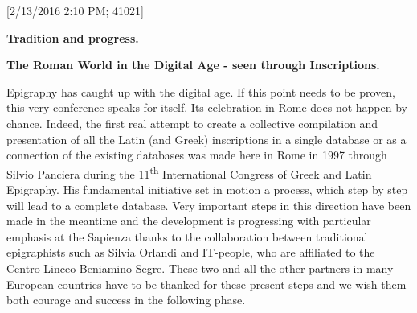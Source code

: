 \documentclass{article}
\begin{document}
[2/13/2016 2:10 PM; 41021]

\begin{center}
\textbf{Tradition and progress.}

\textbf{The Roman World in the Digital Age - seen through Inscriptions. }
\end{center}

Epigraphy has caught up with the digital age. If this point needs to be proven, 
this very conference speaks for itself.  Its celebration in Rome does not happen 
by chance. Indeed, the first real attempt to create a collective compilation and 
presentation of all the Latin (and Greek) inscriptions in a single database or 
as a connection of the existing databases was made here in Rome in 1997 through 
Silvio Panciera during the 11\textsuperscript{th} International Congress of Greek 
and Latin Epigraphy. His fundamental initiative set in motion a process, which 
step by step will lead to a complete database. Very important steps in this direction 
have been made in the meantime and the development is progressing with particular 
emphasis at the Sapienza thanks to the collaboration between traditional epigraphists 
such as Silvia Orlandi and IT-people, who are affiliated to the Centro Linceo Beniamino 
Segre. These two and all the other partners in many European countries have to 
be thanked for these present steps and we wish them both courage and success in 
the following phase. 
\end{document}
